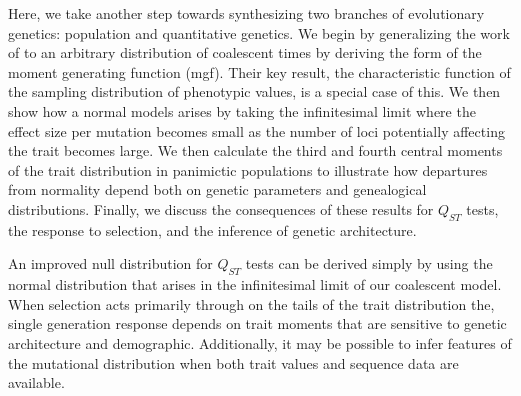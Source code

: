 Here, we take another step towards synthesizing two branches of evolutionary
genetics: population and quantitative genetics. We begin by generalizing the
work of \citet{Schraiber2015} to an arbitrary distribution of coalescent times
by deriving the form of the moment generating function (mgf). Their key result,
the characteristic function of the sampling distribution of phenotypic values,
is a special case of this. We then show how a normal models arises by taking the
infinitesimal limit where the effect size per mutation becomes small as the
number of loci potentially affecting the trait becomes large. We then calculate
the third and fourth central moments of the trait distribution in panimictic
populations to illustrate how departures from normality depend both on genetic
parameters and genealogical distributions. Finally, we discuss the consequences
of these results for $Q_{ST}$ tests, the response to selection, and the
inference of genetic architecture.

An improved null distribution for $Q_{ST}$ tests can be derived simply by using
the normal distribution that arises in the infinitesimal limit of our coalescent
model. When selection acts primarily through on the tails of the trait
distribution the, single generation response depends on trait moments that are
sensitive to genetic architecture and demographic. Additionally, it may be
possible to infer features of the mutational distribution when both trait values
and sequence data are available.

